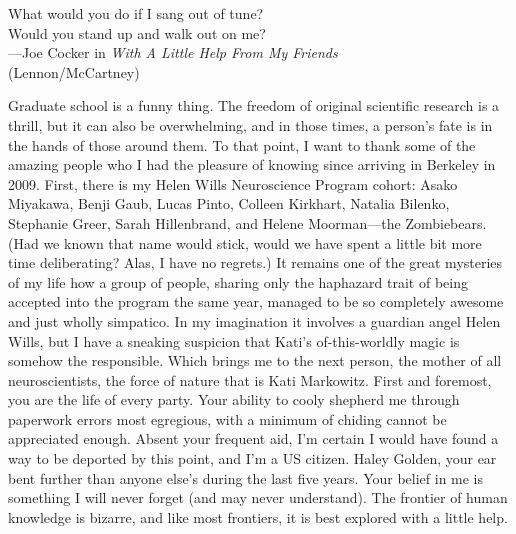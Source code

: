 \documentclass{ucbthesis}
\begin{document}
\begin{frontmatter}
\begin{acknowledgements}
\vfil\null
\begin{center}
What would you do if I sang out of tune?\\Would you stand up and walk out on me?\\
\vspace{5 mm}
 ---Joe Cocker in \textit{With A Little Help From My Friends}\\(Lennon/McCartney)
\end{center}
\vfil\null
Graduate school is a funny thing. The freedom of original scientific research is a thrill, but it can also be overwhelming, and in those times, a person's fate is in the hands of those around them. To that point, I want to thank some of the amazing people who I had the pleasure of knowing since arriving in Berkeley in 2009. First, there is my Helen Wills Neuroscience Program cohort: Asako Miyakawa, Benji Gaub, Lucas Pinto, Colleen Kirkhart, Natalia Bilenko, Stephanie Greer, Sarah Hillenbrand, and Helene Moorman---the Zombiebears. (Had we known that name would stick, would we have spent a little bit more time deliberating? Alas, I have no regrets.) It remains one of the great mysteries of my life how a group of people, sharing only the haphazard trait of being accepted into the program the same year, managed to be so completely awesome and just wholly simpatico. In my imagination it involves a guardian angel Helen Wills, but I have a sneaking suspicion that Kati's of-this-worldly magic is somehow the responsible. Which brings me to the next person, the mother of all neuroscientists, the force of nature that is Kati Markowitz. First and foremost, you are the life of every party. Your ability to cooly shepherd me through paperwork errors most egregious, with a minimum of chiding cannot be appreciated enough. Absent your frequent aid, I'm certain I would have found a way to be deported by this point, and I'm a US citizen. Haley Golden, your ear bent further than anyone else's during the last five years. Your belief in me is something I will never forget (and may never understand). The frontier of human knowledge is bizarre, and like most frontiers, it is best explored with a little help.
\end{acknowledgements}

\end{frontmatter}

\pagestyle{headings}







\printbibliography
\end{document}
